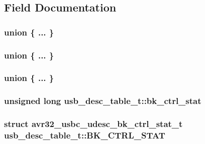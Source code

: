 \subsection{\-Field \-Documentation}
\hypertarget{structusb__desc__table__t_ad29dd31a1ca6a0f04890f85c4156a603}{
\subsubsection[{"@2}]{\setlength{\rightskip}{0pt plus 5cm}union \{ ... \} }}
\label{structusb__desc__table__t_ad29dd31a1ca6a0f04890f85c4156a603}
\hypertarget{structusb__desc__table__t_aaab77e01c3cf927e81fca8744444d5ea}{
\subsubsection[{"@4}]{\setlength{\rightskip}{0pt plus 5cm}union \{ ... \} }}
\label{structusb__desc__table__t_aaab77e01c3cf927e81fca8744444d5ea}
\hypertarget{structusb__desc__table__t_ae9b4e5343629ce78a9d25fdc2d2d9853}{
\subsubsection[{"@6}]{\setlength{\rightskip}{0pt plus 5cm}union \{ ... \} }}
\label{structusb__desc__table__t_ae9b4e5343629ce78a9d25fdc2d2d9853}
\hypertarget{structusb__desc__table__t_a923739f1e7b42d66f71ac7a45e082245}{
\subsubsection[{bk\-\_\-ctrl\-\_\-stat}]{\setlength{\rightskip}{0pt plus 5cm}unsigned long {\bf usb\-\_\-desc\-\_\-table\-\_\-t\-::bk\-\_\-ctrl\-\_\-stat}}}
\label{structusb__desc__table__t_a923739f1e7b42d66f71ac7a45e082245}
\hypertarget{structusb__desc__table__t_a6dad4df05ca7e1703d69b9a47a77122d}{
\subsubsection[{\-B\-K\-\_\-\-C\-T\-R\-L\-\_\-\-S\-T\-A\-T}]{\setlength{\rightskip}{0pt plus 5cm}struct {\bf avr32\-\_\-usbc\-\_\-udesc\-\_\-bk\-\_\-ctrl\-\_\-stat\-\_\-t} {\bf usb\-\_\-desc\-\_\-table\-\_\-t\-::\-B\-K\-\_\-\-C\-T\-R\-L\-\_\-\-S\-T\-A\-T}}}
